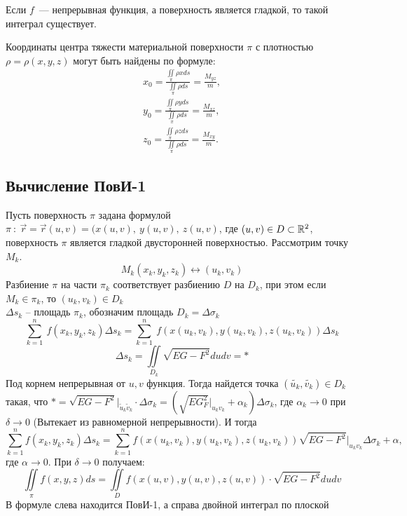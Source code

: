 \documentclass[../../main.tex]{subfiles}
\begin{document}
	Если $f$~--- непрерывная функция, а поверхность является гладкой, то такой 
	интеграл существует.

	Координаты центра тяжести материальной поверхности $\pi$ с плотностью $\rho =
	 \rho(x,y,z)$ могут быть найдены по формуле: 
	\begin{gather*}x_0 = \frac{\iint \limits_\pi \rho  x ds}{\iint \limits_\pi 
	\rho ds} =
	 \frac{M_{yz}}{m}, \\
	y_0 = \frac{\iint \limits_\pi \rho  y ds}{\iint \limits_\pi \rho ds} =
	 \frac{M_{xz}}{m}, \\
	z_0 = \frac{\iint \limits_\pi \rho  z ds}{\iint \limits_\pi \rho ds} =
	 \frac{M_{xy}}{m}.
	 \end{gather*}
	
	\subsection{Вычисление ПовИ-1}
	Пусть поверхность $\pi$ задана формулой $\pi \ : \ \vec{r} =
	 \vec{r}(u, v) = (x(u,v), \ y(u,v), \ z(u, v)$, где $(u, v) \in D
	  \subset \mathbb{R}^2$, поверхность $\pi$ является гладкой двусторонней
	   поверхностью. Рассмотрим точку $M_k$.
	\[M_k(x_k, y_k, z_k) \leftrightarrow (u_k, v_k)\]
	Разбиение $\pi$ на части $\pi_k$ соответствует разбиению $D$ на $D_k$, при 
	этом
	 если $M_k \in \pi_k$, то $(u_k, v_k) \in D_k$\\
	$\Delta s_k$ \--- площадь $\pi_k$, обозначим площадь $D_k  = \Delta\sigma 
	_k$\\
	\[\sum^{n}_{k=1} \ f(x_k, y_k, z_k)\Delta s_k = \sum^{n}_{k=1} \ f(x(u_k, 
	v_k),
	 y(u_k, v_k), z(u_k, v_k))\Delta s_k \]
	\[\Delta s_k = \iint \limits_{D_k}\sqrt{EG - F^2}dudv = *  \]
	Под корнем непрерывная от $u, v$ функция. Тогда найдется точка $(\tilde{u_k},
	 \tilde{v_k}) \in D_k$ такая, что $* = \sqrt{EG -F^2} \big|_{\tilde{u}_k
	  \tilde{v}_k} \cdot \Delta \sigma_k = (\sqrt{EG _F^2} \big|_{u_kv_k} 
	  +\alpha_k)
   \Delta \sigma_k$, где $\alpha_k \to 0$ при $\delta \to 0$ (Вытекает из 
   равномерной
    непрерывности). И тогда 
	\[ \sum_{k=1}^{n} f(x_k,y_k, z_k) \Delta s_k = \sum_{k=1}^{n} f(x(u_k, v_k),
	 y(u_k, v_k), z(u_k, v_k)) \sqrt{EG - F^2}\big|_{u_k v_k} \Delta \sigma_k
	  +\alpha,\]
	где $\alpha \to 0$. При $\delta \to 0$ получаем:
	\begin{equation}
	\label{lec23-1}
	\iint \limits_{\pi} f(x,y,z)ds = \iint \limits_Df(x(u,v), y(u,v),z(u,v)) 
	\cdot \sqrt{EG - F^2} du dv
	\end{equation}
    В формуле слева находится ПовИ-1, а справа двойной интеграл по плоской 
\end{document}
